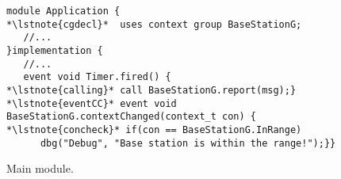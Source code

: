 \begin{figure}[!tb]
\begin{lstlisting}[style=conescframe]
module Application {
*\lstnote{cgdecl}*  uses context group BaseStationG;
   //...
}implementation {
   //...
   event void Timer.fired() {
*\lstnote{calling}* call BaseStationG.report(msg);}
*\lstnote{eventCC}* event void BaseStationG.contextChanged(context_t con) {
*\lstnote{concheck}* if(con == BaseStationG.InRange)
      dbg("Debug", "Base station is within the range!");}}
\end{lstlisting}
\vspace{-4mm}
\caption{Main module.}
  \label{fig:mm}
\vspace{-2mm}
\end{figure}